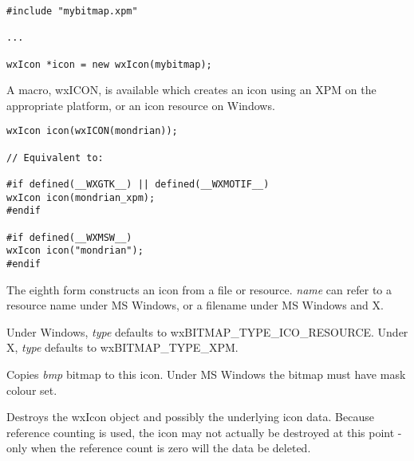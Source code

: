 \begin{verbatim}
#include "mybitmap.xpm"

...

wxIcon *icon = new wxIcon(mybitmap);
\end{verbatim}

A macro, wxICON, is available which creates an icon using an XPM
on the appropriate platform, or an icon resource on Windows.

\begin{verbatim}
wxIcon icon(wxICON(mondrian));

// Equivalent to:

#if defined(__WXGTK__) || defined(__WXMOTIF__)
wxIcon icon(mondrian_xpm);
#endif

#if defined(__WXMSW__)
wxIcon icon("mondrian");
#endif
\end{verbatim}

The eighth form constructs an icon from a file or resource. {\it name} can refer
to a resource name under MS Windows, or a filename under MS Windows and X.

Under Windows, {\it type} defaults to wxBITMAP\_TYPE\_ICO\_RESOURCE.
Under X, {\it type} defaults to wxBITMAP\_TYPE\_XPM.



\label{wxiconcopyfrombitmap}


Copies {\it bmp} bitmap to this icon. Under MS Windows the bitmap
must have mask colour set.






Destroys the wxIcon object and possibly the underlying icon data.
Because reference counting is used, the icon may not actually be
destroyed at this point - only when the reference count is zero will the
data be deleted.

